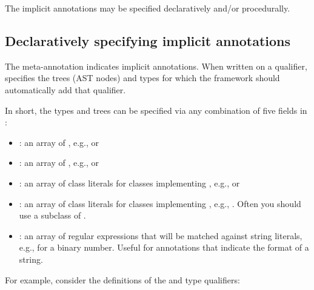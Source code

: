 The implicit annotations may be specified declaratively and/or procedurally.


\subsection{Declaratively specifying implicit annotations\label{declarative-type-introduction}}

The  meta-annotation indicates implicit annotations.
When written on a qualifier, 
specifies the trees (AST nodes) and types for which the framework should
automatically add that qualifier.

In short, the types and trees can be
specified via any combination of five fields in :

  \begin{itemize}
  \item {}: an array of
    \href{\TreeAPIBase{}/tree/Tree.Kind.html?is-external=true}{}, e.g.,
     or 
  \item {}: an array of
    , e.g., 
    or 
  \item
    \begin{sloppypar}
    : an array of class literals for classes
    implementing , e.g.,
     or 
    \end{sloppypar}
  \item {}: an array of class literals for classes
    implementing , e.g.,
    .  Often you should use
    a subclass of .
  \item {}: an array of regular expressions that will
    be matched against
    string literals, e.g.,  for a binary number.  Useful
    for annotations that indicate the format of a string.
  \end{itemize}

For example, consider the definitions of the  and 
type qualifiers:

